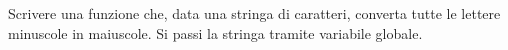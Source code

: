  Scrivere una funzione che, data una stringa di caratteri, converta tutte le lettere minuscole in maiuscole. Si passi la
stringa tramite variabile globale.
